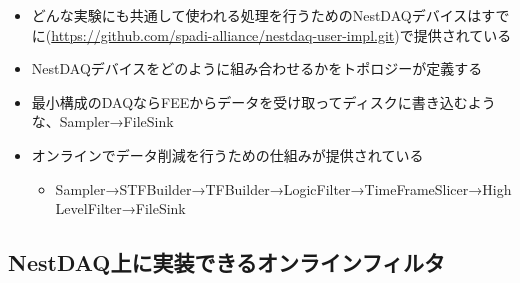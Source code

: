 \documentclass[../main.tex]{subfiles}
\begin{document}
\begin{tcolorbox}[
  title=執筆メモ,
  colback=yellow!8,
  colframe=black!30,
  breakable
]
\begin{itemize}
\begin{itemize}
    \item どんな実験にも共通して使われる処理を行うためのNestDAQデバイスはすでに(\url{https://github.com/spadi-alliance/nestdaq-user-impl.git})で提供されている
    \item NestDAQデバイスをどのように組み合わせるかをトポロジーが定義する
    \item 最小構成のDAQならFEEからデータを受け取ってディスクに書き込むような、Sampler→FileSink
    \item オンラインでデータ削減を行うための仕組みが提供されている
    \begin{itemize}
      \item Sampler→STFBuilder→TFBuilder→LogicFilter→TimeFrameSlicer→HighLevelFilter→FileSink
    \end{itemize}
  \end{itemize}
\end{itemize}
\end{tcolorbox}
\subsection{NestDAQ上に実装できるオンラインフィルタ}
\end{document}
